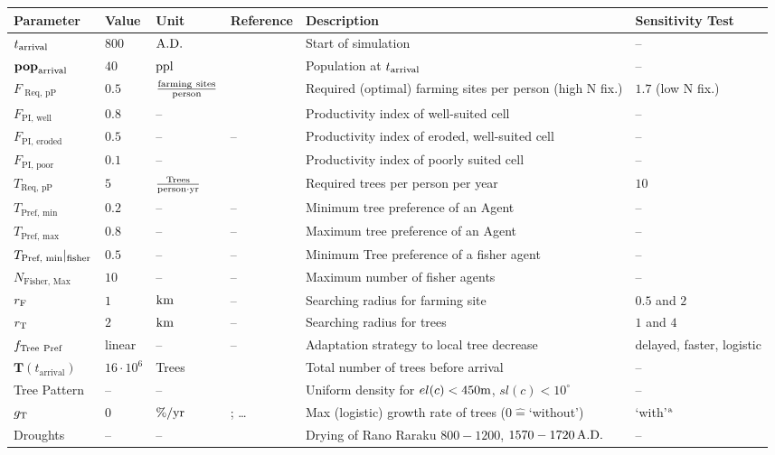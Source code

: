 \begin{flushleft}
\begin{table}
\begin{tabular}{P|W|W|M|K|Q}
		\textbf{Parameter} & \textbf{Value} & \textbf{Unit} & \textbf{Reference} & \textbf{Description} & \textbf{Sensitivity Test}\\ \hline \hline
		$t_{\rm arrival}$ & $800$ &${\rm A.D.}$& \citet{Bahn2017} & Start of simulation & --\\
		$\mathbf{pop}_{\rm arrival}$ & $40$ & ${\rm ppl}$ & \citet{Brander1998} & Population at $t_{\rm arrival}$ & --\\ \hline
		 $F_\text{ Req, pP}$ & $0.5$ & ${\rm \frac{farming\ sites}{person}}$ & \citet{Puleston2017} & Required (optimal) farming sites per person (high N fix.) & $1.7$ (low N fix.) \\
		 $F_\text{PI, well}$ & $0.8$ & -- & \citet{Louwagie2006} & Productivity index of well-suited cell & -- \\
		 $F_\text{PI, eroded}$ & $0.5$ & -- & -- & Productivity index of eroded, well-suited cell & --\\
		 $F_\text{PI, poor}$ & $0.1$ & -- & \citet{Louwagie2006} & Productivity index of poorly suited cell & -- \\ 
		 $T_\text{Req, pP}$ & $5$ & $ {\rm \frac{Trees}{person \cdot yr}}$ & \citet{Brandt2015} & Required trees per person per year & $10$  \\
		  $T_\text{Pref, min}$ & $0.2$ & --&-- & Minimum tree preference of an Agent&  -- \\ 
		  $T_\text{Pref, max}$ & $0.8$ & --&-- & Maximum tree preference of an Agent&  -- \\
		  $T_\text{Pref, min}|_{\rm fisher}$ & $0.5$ & --&-- & Minimum Tree preference of a fisher agent&  -- \\
		  $N_\text{Fisher, Max}$ & $10$ & --&-- & Maximum number of fisher agents &  -- \\ \hline
		   $r_{\rm F}$ & $1$ & ${\rm km}$ & -- & Searching radius for farming site &  %
		  $0.5$ and $2$\\
		  $r_{\rm T}$ & $2$ & ${\rm km}$ & -- & Searching radius for trees &  %
		  $1$ and $4$\\ \hline 
		  $f_{\rm Tree\  Pref}$ & linear & -- & --&  Adaptation strategy to local tree decrease & delayed, faster, logistic \\ \hline
		  	$\mathbf{T}(t_\text{arrival})$ & $16\cdot10^6$ & Trees & \citet{Mieth2015} & Total number of trees before arrival  &  -- \\  
		  Tree Pattern & -- & -- & \citet{Bahn2017} & Uniform density for $el(c)<450{\rm m}$, $sl(c)<10^\circ$ & -- \\ \hline
		  $g_{\rm T}$ & $0$ & $\%/{\rm yr}$ & \citet{Hunt2007}; \ldots %
		  & Max (logistic) growth rate of trees ($0\hat{=}$`without') & `with'$^{\rm a}$ \\ \hline
		  Droughts& -- & -- & \citet{Rull2020} & Drying of Rano Raraku $800-1200$, $1570-1720\, {\rm A.D.}$ & -- \\ \hline 
		  

\end{tabular}
\end{table}
\end{flushleft}
